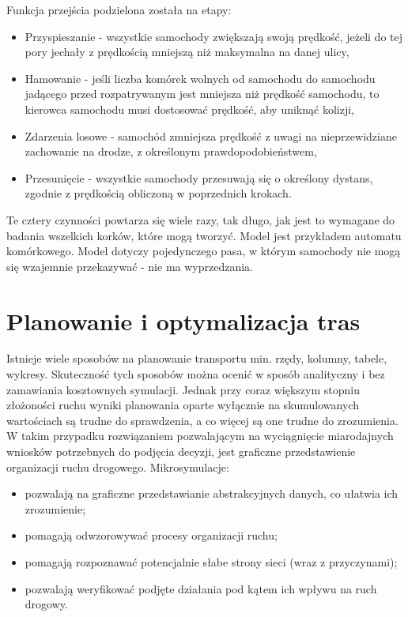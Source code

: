 \documentclass{sprawozdanie-agh}
\begin{document}
\begin{multicols}{2}
		Funkcja przejścia podzielona została na etapy:

		\begin{itemize}
			\item Przyspieszanie - wszystkie samochody zwiększają swoją prędkość, jeżeli do tej pory jechały z prędkością mniejszą niż maksymalna na danej ulicy,
			\item Hamowanie - jeśli liczba komórek wolnych od samochodu do samochodu jadącego przed rozpatrywanym jest mniejsza niż prędkość samochodu, to kierowca samochodu musi dostosować prędkość, aby uniknąć kolizji,
			\item Zdarzenia losowe - samochód zmniejsza prędkość z uwagi na nieprzewidziane zachowanie na drodze, z określonym prawdopodobieństwem,
			\item Przesunięcie - wszystkie samochody przesuwają się o określony dystans, zgodnie z prędkością obliczoną w poprzednich krokach.
		\end{itemize}

		Te cztery czynności powtarza się wiele razy, tak długo, jak jest to wymagane do badania wszelkich korków, które mogą tworzyć. Model jest przykładem automatu komórkowego. Model dotyczy pojedynczego pasa, w którym samochody nie mogą się wzajemnie przekazywać - nie ma wyprzedzania.



		\section{Planowanie i optymalizacja tras}

		Istnieje wiele sposobów na planowanie transportu min. rzędy, kolumny, tabele, wykresy. Skuteczność tych sposobów można ocenić w sposób analityczny i bez zamawiania kosztownych symulacji. Jednak przy coraz większym stopniu złożoności ruchu wyniki planowania oparte wyłącznie na skumulowanych wartościach są trudne do sprawdzenia, a co więcej są one trudne do zrozumienia. W takim przypadku rozwiązaniem pozwalającym na wyciągnięcie miarodajnych wniosków potrzebnych do podjęcia decyzji, jest graficzne przedstawienie organizacji ruchu drogowego. Mikrosymulacje:

		\begin{itemize}
			\item pozwalają na graficzne przedstawianie abstrakcyjnych danych, co ułatwia ich zrozumienie;
			\item pomagają odwzorowywać procesy organizacji ruchu;
			\item pomagają rozpoznawać potencjalnie słabe strony sieci (wraz z przyczynami);
			\item pozwalają weryfikować podjęte działania pod kątem ich wpływu na ruch drogowy.
		\end{itemize}


\end{multicols}
\end{document}
